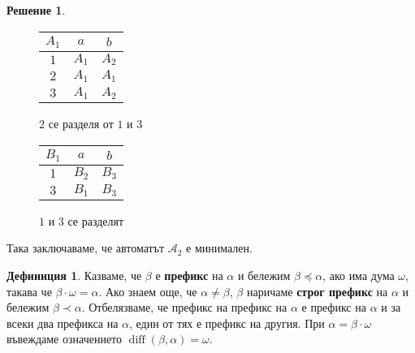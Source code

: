 \documentclass{article}
\theoremstyle{definition}
\newtheorem*{solution}{Решение}
\newtheorem*{definition}{Дефиниция}
\newcommand{\diff}{\operatorname{diff}}
\begin{document}
\begin{solution}
    \begin{figure*}[h]
        \begin{subfigure}{0.5\linewidth}
            \centering
            \begin{tabular}{|c|c|c|}
                \hline
                $A_1$ & $a$   & $b$   \\
                \hline
                $1$   & $A_1$ & $A_2$ \\
                \hline
                $2$   & $A_1$ & $A_1$ \\
                \hline
                $3$   & $A_1$ & $A_2$ \\
                \hline
            \end{tabular}
            \caption*{$A_1 = \{ 1, 2, 3\}$ и $A_2 = \{ 4 \}$}
            \caption*{$2$ се разделя от $1$ и $3$}
        \end{subfigure}
        \begin{subfigure}{0.5\linewidth}
            \centering
            \begin{tabular}{|c|c|c|}
                \hline
                $B_1$ & $a$   & $b$   \\
                \hline
                $1$   & $B_2$ & $B_3$ \\
                \hline
                $3$   & $B_1$ & $B_3$ \\
                \hline
            \end{tabular}
            \caption*{$B_1 = \{ 1, 3\}, B_2 = \{ 2 \}$ и $B_3 = \{ 4 \}$}
            \caption*{$1$ и $3$ се разделят}
        \end{subfigure}
    \end{figure*}

    Така заключаваме, че автоматът $\mathcal{A}_2$ е минимален.
\end{solution}

\begin{definition}
    Казваме, че $\beta$ е \textbf{префикс} на $\alpha$ и бележим ${\beta \preceq \alpha}$, ако има дума $\omega$, такава че $\beta \cdot \omega = \alpha$.
    Ако знаем още, че $\alpha \neq \beta$, $\beta$ наричаме \textbf{строг префикс} на $\alpha$ и бележим $\beta \prec \alpha$.
    Отбелязваме, че префикс на префикс на $\alpha$ е префикс на $\alpha$ и за всеки два префикса на $\alpha$, един от тях е префикс на другия.
    При $\alpha = \beta \cdot \omega$ въвеждаме означението $\diff(\beta, \alpha) = \omega$.
\end{definition}
\end{document}
